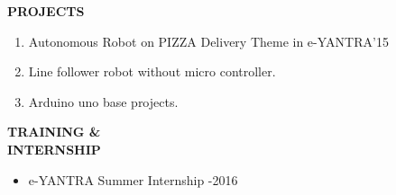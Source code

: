 \documentclass{article}
\begin{document}
 \begin{flushleft} 
 	\vspace{0.2in}
 	\textbf{PROJECTS}
 	\begin{enumerate}
 		\vspace{-0.29in}
 		\addtolength{\itemindent}{1.359in}
 		\item  Autonomous Robot on PIZZA Delivery Theme in e-YANTRA'15
 		\item  Line follower robot without micro controller.
 		\item  Arduino uno base projects.
 	\end{enumerate}
 \end{flushleft}
 
 \begin{flushleft} 
 	\vspace{0.4in}
 	\textbf{TRAINING \& \\ INTERNSHIP}
 	\begin{itemize}
 		\vspace{-0.44in}
 		\addtolength{\itemindent}{1.359in}
 		\item  e-YANTRA Summer Internship -2016
 	\end{itemize}
 \end{flushleft}
 
 
\end{document}
